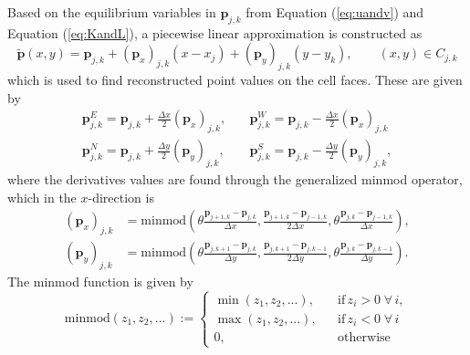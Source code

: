 \documentclass[11pt, a4paper]{article}
\newcommand{\vecp}[0]{\bm{p}}
\newcommand{\dx}[0]{\Delta x}
\newcommand{\dy}[0]{\Delta y}
\newcommand{\eref}[1]{Equation (\ref{eq:#1})}
\begin{document}
Based on the equilibrium variables in $\vecp_{j,k}$ from \eref{uandv} and \eref{KandL}, a piecewise linear approximation is constructed as 
\begin{equation}
	\tilde{\vecp}(x,y) = \vecp_{j,k} + (\vecp_x)_{j,k}(x - x_j) + (\vecp_y)_{j,k}(y - y_k), \qquad (x, y) \in C_{j,k}
	\label{eq:equilibriuimReconstruction}
\end{equation}
which is used to find reconstructed point values on the cell faces.
These are given by
\begin{equation}
	\begin{split}
		\vecp_{j,k}^E = \vecp_{j,k} + \frac{\dx}{2} \left( \vecp_{x} \right)_{j,k}, &\quad
		\vecp_{j,k}^W = \vecp_{j,k} - \frac{\dx}{2} \left( \vecp_{x} \right)_{j,k} \\
		\vecp_{j,k}^N = \vecp_{j,k} + \frac{\dy}{2} \left( \vecp_{y} \right)_{j,k},&\quad
		\vecp_{j,k}^S = \vecp_{j,k} - \frac{\dy}{2} \left( \vecp_{y} \right)_{j,k},
	\end{split}
	\label{eq:pOnFaces}
\end{equation}
where the derivatives values are found through the generalized minmod operator, which in the $x$-direction is
\begin{equation} 
	\begin{split}
	\left( \vecp_x \right)_{j,k} &= \mathrm{minmod}\left( \theta \frac{\vecp_{j+1, k} - \vecp_{j,k}}{\dx}, 
										   		\frac{\vecp_{j+1, k} - \vecp_{j-1,k}}{2\dx},
										    	\theta \frac{\vecp_{j, k} - \vecp_{j-1,k}}{\dx}  \right), \\
	\left( \vecp_y \right)_{j,k} &= \mathrm{minmod}\left( \theta \frac{\vecp_{j, k+1} - \vecp_{j,k}}{\dy}, 
										   		\frac{\vecp_{j, k+1} - \vecp_{j,k-1}}{2\dy},
										    	\theta \frac{\vecp_{j, k} - \vecp_{j,k-1}}{\dy}  \right).
	\end{split}
	\label{eq:pDerivatives}
\end{equation}
The minmod function is given by
\begin{equation*}
	\mathrm{minmod}(z_1, z_2, ...) := \begin{cases}
		\min(z_1, z_2, ...), \quad 	&\mathrm{if} \, z_i > 0 \; \forall \, i, \\
		\max(z_1, z_2, ...), 		&\mathrm{if}\, z_i < 0 \; \forall \, i \\
		0,\quad 				&\mathrm{otherwise}
	\end{cases}
\end{equation*}
\end{document}
